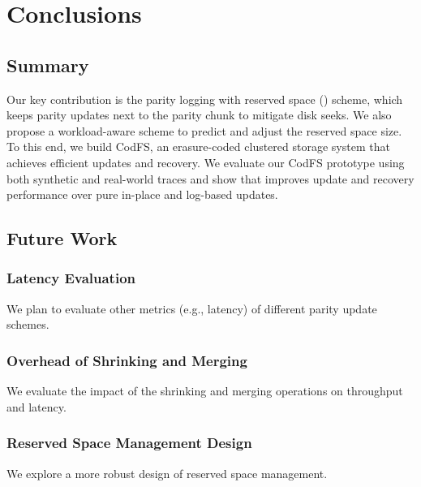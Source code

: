 \chapter{Conclusions}
\label{chap:conclusions}

\section{Summary}

Our key contribution is the parity logging with reserved space (\PLR) scheme,
which keeps parity updates next to the parity chunk to mitigate disk seeks. We
also propose a workload-aware scheme to predict and adjust the reserved space
size.  To this end, we build CodFS, an erasure-coded clustered storage system
that achieves efficient updates and recovery.  We evaluate our CodFS prototype
using both synthetic and real-world traces and show that \PLR improves update
and recovery performance over pure in-place and log-based updates.  

\section{Future Work}

\subsection{Latency Evaluation}

We plan to evaluate other metrics (e.g., latency) of different parity
update schemes. 

\subsection{Overhead of Shrinking and Merging}

We evaluate the impact of the shrinking and merging
operations on throughput and latency. 

\subsection{Reserved Space Management Design}

We explore a more robust design of
reserved space management.
